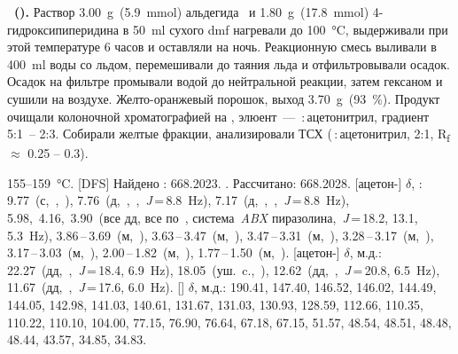 \textbf{~().}
Раствор \SI{3.00}{\gram}~(\SI{5.9}{\mmol}) альдегида~ и \SI{1.80}{\gram}~(\SI{17.8}{\mmol}) 4-гидроксипиперидина в \SI{50}{\milli\litre} сухого \ac{dmf} нагревали до \SI{100}{\celsius}, выдерживали при этой температуре 6 часов и оставляли на ночь.
Реакционную смесь выливали в \SI{400}{\milli\litre} воды со льдом, перемешивали до таяния льда и отфильтровывали осадок.
Осадок на фильтре промывали водой до нейтральной реакции, затем гексаном и сушили на воздухе.
Желто-оранжевый порошок, выход \SI{3.70}{\gram}~(\SI{93}{\percent}).
Продукт очищали колоночной хроматографией на , элюент~--- \,:\,ацетонитрил, градиент 5:1~-- 2:3. Собирали желтые фракции, анализировали ТСХ (\,:\,ацетонитрил, 2:1, R\textsubscript{f} $\approx$ 0.25 -- 0.3).
\begin{experimental}[]
     155--\SI{159}{\celsius}.
    [DFS] Найдено \ce{[M+]}: \num{668.2023}. . Рассчитано:  \num{668.2028}.
    [ацетон-] $\delta$, \si{\ppm}: 9.77~(с,~,~), 7.76~(д,~,~,~\textit{J}\,=\,8.8~\si{\hertz}), 7.17~(д,~,~,~\textit{J}\,=\,8.8~\si{\hertz}), 5.98,~4.16,~3.90~(все дд, все по~, система~\emph{ABX} пиразолина,~\textit{J}\,=\,18.2, 13.1, 5.3~\si{\hertz}), 3.86\,--\,3.69~(м,~), 3.63\,--\,3.47~(м,~), 3.47\,--\,3.31~(м,~), 3.28\,--\,3.17~(м,~), 3.17\,--\,3.03~(м,~), 2.00\,--\,1.82~(м,~), 1.77\,--\,1.50~(м,~).
    [ацетон-] $\delta$, м.д.: 22.27~(дд,~,~\textit{J}\,=\,18.4, 6.9~\si{\hertz}), 18.05~(уш.~c.,~), 12.62~(дд,~,~\textit{J}\,=\,20.8, 6.5~\si{\hertz}), 11.67~(дд,~,~\textit{J}\,=\,17.6, 6.0~\si{\hertz}).
    [] $\delta$, м.д.: 190.41, 147.40, 146.52, 146.02, 144.49, 144.05, 142.98, 141.03, 140.61, 131.67, 131.03, 130.93, 128.59, 112.66, 110.35, 110.22, 110.10, 104.00, 77.15, 76.90, 76.64, 67.18, 67.15, 51.57, 48.54, 48.51, 48.48, 48.44, 43.57, 34.85, 34.83.
\end{experimental}


